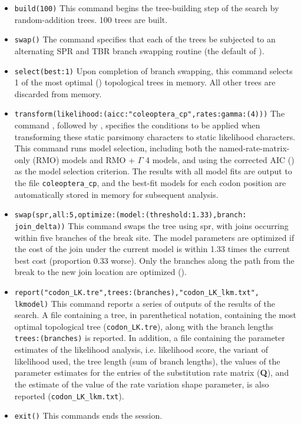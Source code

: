 \begin{itemize}
\item \texttt{build(100)} This command begins the tree-building step of the search by random-addition trees. 100 trees 
are built.
\item \texttt{swap()} The  command specifies that each of the trees be subjected to an 
alternating SPR and TBR branch swapping routine (the default of \poy).
\item \texttt{select(best:1)} Upon completion of branch swapping, this command selects 1 of 
the most optimal () topological trees in memory. All other trees are discarded 
from memory.
\item \texttt{transform(likelihood:(aicc:"coleoptera\_cp",rates:gamma:(4)))} The command 
, followed by , specifies the conditions to be applied 
when transforming these static parsimony characters to static likelihood characters. This command runs model 
selection, including both the named-rate-matrix-only (RMO) models and RMO + $\Gamma$ 4 models, 
and using the corrected AIC () as the model selection criterion. The results with all model fits are 
output to the file \texttt{coleoptera\_cp}, and the best-fit models for each codon position are automatically 
stored in memory for subsequent analysis.
\item \texttt{swap(spr,all:5,optimize:(model:(threshold:1.33),branch: \\ join\_delta))} This command swaps the tree using 
spr, with joins occurring within five branches of the break site. The model parameters are
optimized if the cost of the join under the current model is within 1.33 times the current best cost (proportion 0.33 worse). 
Only the branches along the path from the break to the new join location are optimized (). 
\item \texttt{report("codon\_LK.tre",trees:(branches),"codon\_LK\_lkm.txt",\\ lkmodel)} This command reports a 
series of outputs of the results of the search.  A file containing a tree, in parenthetical notation, containing the most 
optimal topological tree (\texttt{codon\_LK.tre}), along with the branch lengths \texttt{trees:(branches)} is reported.
In addition, a file containing the parameter estimates of the likelihood analysis, i.e. likelihood score, the variant of 
likelihood used, the tree length (sum of branch lengths), the values 
of the parameter estimates for the entries of the substitution rate matrix (\textbf{Q}), and the estimate of the value of 
the rate variation shape parameter, is also reported (\texttt{codon\_LK\_lkm.txt}).
\item \texttt{exit()} This commands ends the \poy session.
\end{itemize}


